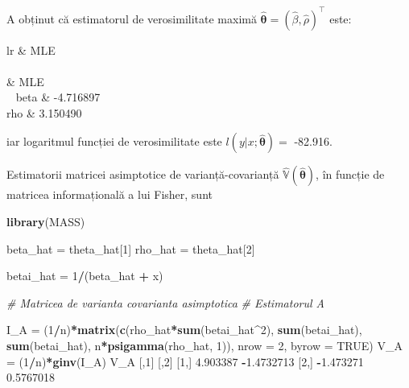 \documentclass[]{article}
\newenvironment{Shaded}{\begin{snugshade}}{\end{snugshade}}
\newcommand{\KeywordTok}[1]{\textcolor[rgb]{0.13,0.29,0.53}{\textbf{#1}}}
\newcommand{\DataTypeTok}[1]{\textcolor[rgb]{0.13,0.29,0.53}{#1}}
\newcommand{\DecValTok}[1]{\textcolor[rgb]{0.00,0.00,0.81}{#1}}
\newcommand{\FloatTok}[1]{\textcolor[rgb]{0.00,0.00,0.81}{#1}}
\newcommand{\StringTok}[1]{\textcolor[rgb]{0.31,0.60,0.02}{#1}}
\newcommand{\CommentTok}[1]{\textcolor[rgb]{0.56,0.35,0.01}{\textit{#1}}}
\newcommand{\OtherTok}[1]{\textcolor[rgb]{0.56,0.35,0.01}{#1}}
\newcommand{\OperatorTok}[1]{\textcolor[rgb]{0.81,0.36,0.00}{\textbf{#1}}}
\newcommand{\NormalTok}[1]{#1}
\begin{document}
A obținut că estimatorul de verosimilitate maximă
\(\hat{\boldsymbol{\theta}} = (\hat{\beta}, \hat{\rho})^\intercal\)
este:


\begin{longtable}{lr}
\hiderowcolors
\toprule
  & MLE\\
\midrule
\endfirsthead
{}\\
\toprule
  & MLE\\
\midrule
\endhead
\
\endfoot
\bottomrule
\endlastfoot
\showrowcolors
beta & -4.716897\\
rho & 3.150490\\*
\end{longtable}


iar logaritmul funcției de verosimilitate este
\(l(y|x;\hat{\boldsymbol{\theta}}) =\) -82.916.

Estimatorii matricei asimptotice de varianță-covarianță
\(\hat{\mathbb{V}}(\hat{\boldsymbol{\theta}})\), în funcție de matricea
informațională a lui Fisher, sunt

\begin{Shaded}
\begin{Highlighting}[]
\KeywordTok{library}\NormalTok{(MASS)}

\NormalTok{beta_hat =}\StringTok{ }\NormalTok{theta_hat[}\DecValTok{1}\NormalTok{]}
\NormalTok{rho_hat =}\StringTok{ }\NormalTok{theta_hat[}\DecValTok{2}\NormalTok{]}

\NormalTok{betai_hat =}\StringTok{ }\DecValTok{1}\OperatorTok{/}\NormalTok{(beta_hat }\OperatorTok{+}\StringTok{ }\NormalTok{x)}

\CommentTok{# Matricea de varianta covarianta asimptotica }
\CommentTok{# Estimatorul A}

\NormalTok{I_A =}\StringTok{ }\NormalTok{(}\DecValTok{1}\OperatorTok{/}\NormalTok{n)}\OperatorTok{*}\KeywordTok{matrix}\NormalTok{(}\KeywordTok{c}\NormalTok{(rho_hat}\OperatorTok{*}\KeywordTok{sum}\NormalTok{(betai_hat}\OperatorTok{^}\DecValTok{2}\NormalTok{), }\KeywordTok{sum}\NormalTok{(betai_hat),}
                    \KeywordTok{sum}\NormalTok{(betai_hat), n}\OperatorTok{*}\KeywordTok{psigamma}\NormalTok{(rho_hat, }\DecValTok{1}\NormalTok{)), }
                  \DataTypeTok{nrow =} \DecValTok{2}\NormalTok{, }
                  \DataTypeTok{byrow =} \OtherTok{TRUE}\NormalTok{)}
\NormalTok{V_A =}\StringTok{ }\NormalTok{(}\DecValTok{1}\OperatorTok{/}\NormalTok{n)}\OperatorTok{*}\KeywordTok{ginv}\NormalTok{(I_A)}
\NormalTok{V_A}
\NormalTok{          [,}\DecValTok{1}\NormalTok{]       [,}\DecValTok{2}\NormalTok{]}
\NormalTok{[}\DecValTok{1}\NormalTok{,]  }\FloatTok{4.903387} \OperatorTok{-}\FloatTok{1.4732713}
\NormalTok{[}\DecValTok{2}\NormalTok{,] }\OperatorTok{-}\FloatTok{1.473271}  \FloatTok{0.5767018}
\end{Highlighting}
\end{Shaded}
\end{document}
